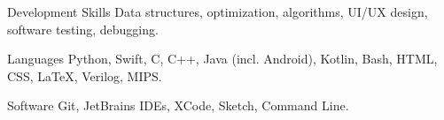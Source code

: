 
\begin{cvskills}

  \cvskill
    {Development Skills} %
    {Data structures, optimization, algorithms, UI/UX design, software testing, debugging. } %

  \cvskill
    {Languages} %
    {Python, Swift, C, C++, Java (incl. Android), Kotlin, Bash, HTML, CSS, LaTeX, Verilog, MIPS.} %


  \cvskill
    {Software} %
    {Git, JetBrains IDEs, XCode, Sketch, Command Line.} %



\end{cvskills}
